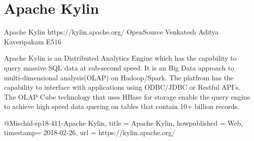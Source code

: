 \section{Apache Kylin}

Apache Kylin
https://kylin.apache.org/
OpenSource
Venkatesh Aditya Kaveripakam
E516

Apache Kylin is an Distributed Analytics Engine which has the capability to
query massive SQL data at sub-second speed. It is an Big Data approach to
multi-dimensional analysis(OLAP) on Hadoop/Spark. The platfrom has the
capability to interface with applications using ODBC/JDBC or Restful API's.
The OLAP Cube technology that uses HBase for storage enable the query engine
to achieve high speed data quering on tables that contain 10+ billion records.

@Misc{hid-sp18-411-Apache Kylin,
title = {Apache Kylin},
howpublished = {Web},
timestamp= {2018-02-26},
url = {https://kylin.apache.org/}
}
